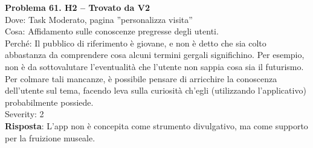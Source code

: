 \documentclass{article}
\begin{document}
\noindent \textbf{Problema 61. H2 – Trovato da V2} \\
Dove: Task Moderato, pagina ”personalizza visita” \\
Cosa: Affidamento sulle conoscenze pregresse degli utenti. \\
Perché: Il pubblico di riferimento è giovane, e non è detto che sia colto abbastanza da comprendere cosa alcuni termini gergali significhino. Per esempio, non è da sottovalutare l’eventualità che l’utente non sappia cosa sia il futurismo. Per colmare tali mancanze, è possibile pensare di arricchire la conoscenza dell’utente sul tema, facendo leva sulla curiosità ch’egli (utilizzando l’applicativo) probabilmente possiede. \\
Severity: 2 \\
\textbf{Risposta}: L’app non è concepita come strumento divulgativo, ma come supporto per la fruizione museale.
\end{document}

